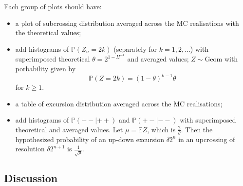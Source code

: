 \documentclass[a4paper]{report}
\newcommand{\pr}{\mathbb{P}}
\newcommand{\ex}{\mathbb{E}}
\begin{document}
Each group of plots should have: \begin{itemize}
	\item a plot of subcrossing distribution averaged across the MC realisations with
	the theoretical values;
	\item add histograms of $\pr(Z_n = 2k)$ (separately for $k=1,2,\ldots$) with
	superimposed theoretical $\theta = 2^{1-H^{-1}}$ and averaged values;
	$Z\sim\text{Geom}$ with porbability given by
	\[\pr(Z = 2k) = (1-\theta)^{k-1} \theta\]
	for $k\geq 1$.
	\item a table of excursion distribution averaged across the MC realisations;
	\item add histograms of $\pr(+-|++)$ and $\pr(+-|--)$ with superimposed theoretical
	and averaged values. Let $\mu = \ex Z$, which is $\frac{2}{\theta}$. Then the
	hypothesized probability of an up-down excursion $\delta 2^n$ in an upcrossing
	of resolution $\delta 2^{n+1}$ is $\frac{1}{\sqrt{\mu}}$.
\end{itemize}


\subsection{Discussion} %
\label{sub:discussion}




\clearpage


% 



% 
\end{document}
